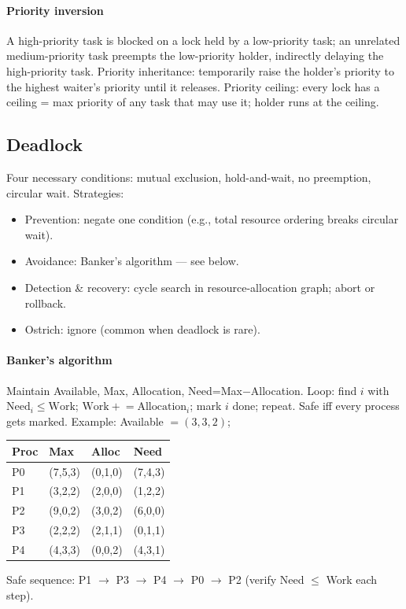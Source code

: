 \paragraph{Priority inversion}
A high-priority task is blocked on a lock held by a low-priority task; an unrelated medium-priority task preempts the low-priority holder, indirectly delaying the high-priority task.
\textcolor{Bittersweet}{Priority inheritance}: temporarily raise the holder's priority to the highest waiter's priority until it releases.
\textcolor{Bittersweet}{Priority ceiling}: every lock has a ceiling = max priority of any task that may use it; holder runs at the ceiling.

\subsection{Deadlock}
Four necessary conditions: \textcolor{Bittersweet}{mutual exclusion}, \textcolor{Bittersweet}{hold-and-wait}, \textcolor{Bittersweet}{no preemption}, \textcolor{Bittersweet}{circular wait}.
Strategies:
\begin{itemize}
  \item \textcolor{Bittersweet}{Prevention}: negate one condition (e.g., total resource ordering breaks circular wait).
  \item \textcolor{Bittersweet}{Avoidance}: Banker's algorithm — see below.
  \item \textcolor{Bittersweet}{Detection \& recovery}: cycle search in resource-allocation graph; abort or rollback.
  \item \textcolor{Bittersweet}{Ostrich}: ignore (common when deadlock is rare).
\end{itemize}
\paragraph{Banker's algorithm}
Maintain Available, Max, Allocation, Need=Max$-$Allocation. Loop: find $i$ with $\text{Need}_i \le \text{Work}$; $\text{Work} \mathrel{+}= \text{Allocation}_i$; mark $i$ done; repeat. Safe iff every process gets marked.
Example: Available $=(3,3,2)$;
\begin{tabular}{@{}llll@{}}
\toprule
Proc & Max & Alloc & Need \\
\midrule
P0 & (7,5,3) & (0,1,0) & (7,4,3) \\
P1 & (3,2,2) & (2,0,0) & (1,2,2) \\
P2 & (9,0,2) & (3,0,2) & (6,0,0) \\
P3 & (2,2,2) & (2,1,1) & (0,1,1) \\
P4 & (4,3,3) & (0,0,2) & (4,3,1) \\
\bottomrule
\end{tabular}
Safe sequence: P1 $\to$ P3 $\to$ P4 $\to$ P0 $\to$ P2 (verify Need $\le$ Work each step).
